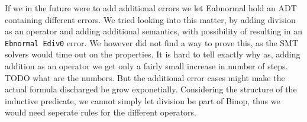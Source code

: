 If we in the future were to add additional errors we let Eabnormal hold an ADT containing different errors.
We tried looking into this matter, by adding division as an operator and adding additional semantics,
with possibility of resulting in an \texttt{Ebnormal Ediv0} error. We however did not find a way to prove this,
as the SMT solvers would time out on the properties. It is hard to tell exactly why as, adding addition as an operator we get only a fairly small increase in number of steps.
TODO what are the numbers.
But the additional error cases might make the actual formula discharged be grow exponetially. Considering the structure of the inductive predicate, we cannot simply let division be part of
Binop, thus we would need seperate rules for the different operators.





